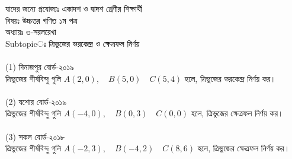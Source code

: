 \documentclass{article}
\begin{document}
 
	\Large
	যাদের জন্যে প্রযোজ্যঃ  	\textcolor{black}{একাদশ ও দ্বাদশ শ্রেণীর শিক্ষার্থী} \\
বিষয়ঃ \textcolor{black}{উচ্চতর গণিত ১ম পত্র} \\
অধ্যায়ঃ \textcolor{black}{৩-সরলরেখা }\\ 
Subtopicঃ \textcolor{black}{ত্রিভুজের ভরকেন্দ্র ও ক্ষেত্রফল নির্ণয় }\\	
\\
(1) দিনাজপুর বোর্ড-২০১৯\\
ত্রিভুজের শীর্ষবিন্দু গুলি $A(2,0),\quad B(5,0)\quad C(5,4)$ হলে, ত্রিভুজের ভরকেন্দ্র নির্ণয় কর। \\
\\
(2) যশোর বোর্ড-২০১৯\\
ত্রিভুজের শীর্ষবিন্দু গুলি $A(-4,0),\quad B(0,3)\quad C(0,0)$ হলে, ত্রিভুজের ক্ষেত্রফল নির্ণয় কর। \\
\\
(3) সকল বোর্ড-২০১৮\\
ত্রিভুজের শীর্ষবিন্দু গুলি $A(-2,3),\quad B(-4,2)\quad C(8,6)$ হলে, ত্রিভুজের ক্ষেত্রফল নির্ণয় কর। \\
\end{document}
